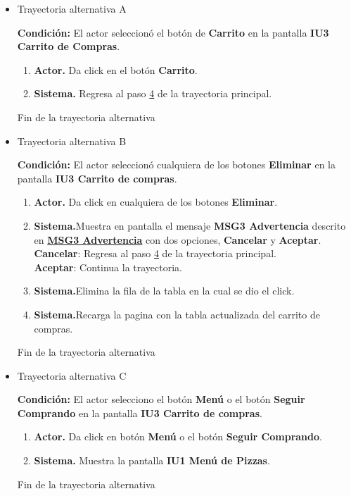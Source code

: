 \begin{itemize}
	
	\item \hypertarget{CU2:TAA}{Trayectoria alternativa A}
	
	\noindent \textbf{Condición:} El actor seleccionó el botón de \textbf{Carrito} en la pantalla \textbf{IU3 Carrito de Compras}.
	
	\begin{enumerate}
		\item \textbf{Actor.} Da click en el botón \textbf{Carrito}.
		\item \textbf{Sistema.} Regresa al paso \hyperlink{CU2:TP:P4}{4} de la trayectoria principal.
	\end{enumerate}
	
	Fin de la trayectoria alternativa
	
	\item \hypertarget{CU2:TAB}{Trayectoria alternativa B}
	
	\noindent \textbf{Condición:} El actor seleccionó cualquiera de los botones \textbf{Eliminar} en la pantalla \textbf{IU3 Carrito de compras}.
	
	\begin{enumerate}
		\item \textbf{Actor.} Da click en cualquiera de los botones  \textbf{Eliminar}.
		\item \textbf{Sistema.}Muestra en pantalla el mensaje \textbf{MSG3 Advertencia} descrito en \hyperlink{MSG3:Advertencia}{\textbf{MSG3 Advertencia}} con dos opciones, \textbf{Cancelar} y \textbf{Aceptar}.
		\\ \textbf{Cancelar}: Regresa al paso \hyperlink{CU2:TP:P4}{4} de la trayectoria principal.
		\\ \textbf{Aceptar}: Continua la trayectoria.
		\item \textbf{Sistema.}Elimina la fila de la tabla en la cual se dio el click.
		\item \textbf{Sistema.}Recarga la pagina con la tabla actualizada del carrito de compras.
	\end{enumerate}
	
	Fin de la trayectoria alternativa
	
	\item \hypertarget{CU2:TAC}{Trayectoria alternativa C}
	
	\noindent \textbf{Condición:} El actor selecciono el botón \textbf{Menú} o el botón \textbf{Seguir Comprando} en la pantalla \textbf{IU3 Carrito de compras}.
	
	\begin{enumerate}
		\item \textbf{Actor.} Da click en botón \textbf{Menú} o el botón \textbf{Seguir Comprando}.
		\item \textbf{Sistema.} Muestra la pantalla \textbf{IU1 Menú de Pizzas}.
	\end{enumerate}
	
	Fin de la trayectoria alternativa

\end{itemize}

